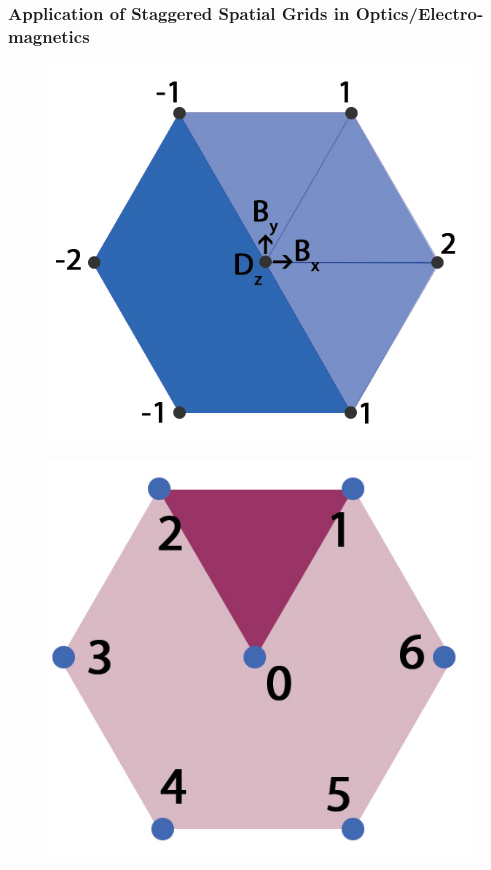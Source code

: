\documentclass{beamer}
\begin{document}

\begin{frame}
\frametitle{Application of Staggered Spatial Grids in Optics/Electro-magnetics}

\tiny

\begin{figure}
\centering
\begin{minipage}{.5\textwidth}
  \centering
\includegraphics[scale=0.2]{./images/jpgUnStaggered.jpg}
\label{fig:StaggeredColocated}
\end{minipage}%
\begin{minipage}{.5\textwidth}
  \centering
\includegraphics[scale=0.2]{./images/jpgHexGridStruc.jpg}
\end{minipage}
\end{figure}


\end{frame}
\end{document}
